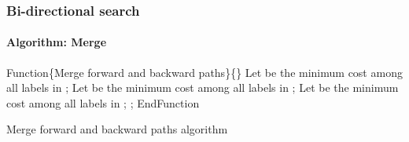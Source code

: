 \begin{frame}
  \frametitle{Bi-directional search}
  \framesubtitle{Algorithm: Merge}
  \begin{algorithm}[H]
    \scriptsize
    \begin{algorithmic}[1]
     \STATE Function\{Merge forward and backward paths\}\{\}
       \STATE Let  be the minimum cost among all labels in ;
       \STATE Let  be the minimum cost among all labels in ;
       \STATE Let  be the minimum cost among all labels in ;
                       \STATE {};
                     \ENDIF
                   \ENDFOR
                 \ENDIF
               \ENDFOR
             \ENDIF
           \ENDFOR
         \ENDIF
       \ENDFOR
     \STATE EndFunction
    \end{algorithmic}
    \caption{Merge forward and backward paths algorithm}
    \label{alg3:backward_extension}
  \end{algorithm}
\end{frame}
